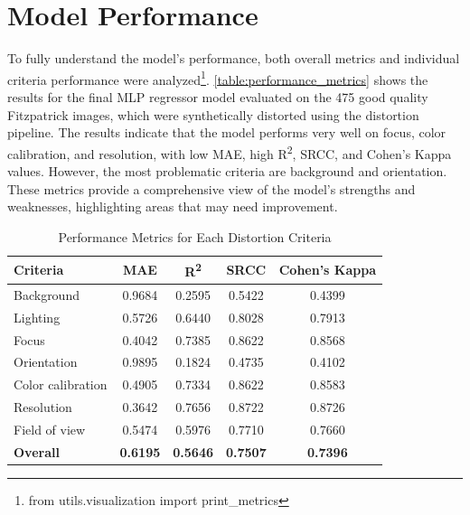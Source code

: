 \section{Model Performance}
\label{sec:ModelPerformance}
To fully understand the model’s performance, both overall metrics and individual criteria performance were analyzed\footnote{from utils.visualization import print\_metrics}. \autoref{table:performance_metrics} shows the results for the final MLP regressor model evaluated on the 475 good quality Fitzpatrick images, which were synthetically distorted using the distortion pipeline. The results indicate that the model performs very well on focus, color calibration, and resolution, with low MAE, high R\textsuperscript{2}, SRCC, and Cohen’s Kappa values. However, the most problematic criteria are background and orientation. These metrics provide a comprehensive view of the model’s strengths and weaknesses, highlighting areas that may need improvement. \par
\begin{table}[h]
    \centering
    \begin{tabular}{|l|c|c|c|c|}
        \hline
        \textbf{Criteria} & \textbf{MAE} & \textbf{R\textsuperscript{2}} & \textbf{SRCC} & \textbf{Cohen's Kappa} \\
        \hline
        Background & 0.9684 & 0.2595 & 0.5422 & 0.4399 \\
        Lighting & 0.5726 & 0.6440 & 0.8028 & 0.7913 \\
        Focus & 0.4042 & 0.7385 & 0.8622 & 0.8568 \\
        Orientation & 0.9895 & 0.1824 & 0.4735 & 0.4102 \\
        Color calibration & 0.4905 & 0.7334 & 0.8622 & 0.8583 \\
        Resolution & 0.3642 & 0.7656 & 0.8722 & 0.8726 \\
        Field of view & 0.5474 & 0.5976 & 0.7710 & 0.7660 \\
        \hline
        \textbf{Overall} & \textbf{0.6195} & \textbf{0.5646} & \textbf{0.7507} & \textbf{0.7396} \\
        \hline
    \end{tabular}
    \caption{Performance Metrics for Each Distortion Criteria}
    \label{table:performance_metrics}
\end{table}

